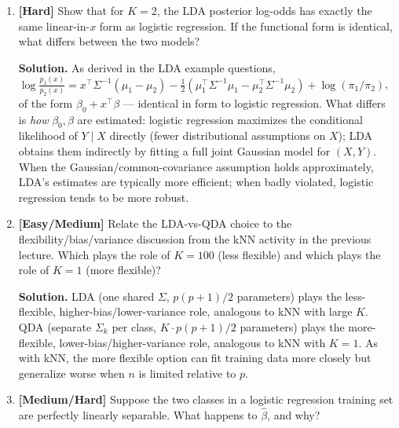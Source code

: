 \documentclass[11pt]{article}
\begin{document}
\begin{enumerate}
\textbf{Solution.} $\text{score}(D)=0.01\times0.9\times0.8=0.0072$; $\text{score}(\bar D)=0.99\times0.05\times0.1=0.00495$. Normalizing, $\Pr(D\mid x)\approx0.0072/0.01215\approx0.593$: classify as disease, though barely above $0.5$ despite a very low base rate --- strong evidence from two symptoms can overcome a low prior. Worth flagging: in a real diagnostic setting symptoms are often correlated, so this Naive Bayes estimate should be treated cautiously.

\item \textbf{[Hard]} Show that for $K=2$, the LDA posterior log-odds has exactly the same linear-in-$x$ form as logistic regression. If the functional form is identical, what differs between the two models?

\textbf{Solution.} As derived in the LDA example questions, $\log\frac{p_1(x)}{p_2(x)} = x^\top\Sigma^{-1}(\mu_1-\mu_2) - \tfrac12(\mu_1^\top\Sigma^{-1}\mu_1-\mu_2^\top\Sigma^{-1}\mu_2) + \log(\pi_1/\pi_2)$, of the form $\beta_0+x^\top\beta$ --- identical in form to logistic regression. What differs is \emph{how} $\beta_0,\beta$ are estimated: logistic regression maximizes the conditional likelihood of $Y\mid X$ directly (fewer distributional assumptions on $X$); LDA obtains them indirectly by fitting a full joint Gaussian model for $(X,Y)$. When the Gaussian/common-covariance assumption holds approximately, LDA's estimates are typically more efficient; when badly violated, logistic regression tends to be more robust.

\item \textbf{[Easy/Medium]} Relate the LDA-vs-QDA choice to the flexibility/bias/variance discussion from the kNN activity in the previous lecture. Which plays the role of $K=100$ (less flexible) and which plays the role of $K=1$ (more flexible)?

\textbf{Solution.} LDA (one shared $\Sigma$, $p(p+1)/2$ parameters) plays the less-flexible, higher-bias/lower-variance role, analogous to kNN with large $K$. QDA (separate $\Sigma_k$ per class, $K\cdot p(p+1)/2$ parameters) plays the more-flexible, lower-bias/higher-variance role, analogous to kNN with $K=1$. As with kNN, the more flexible option can fit training data more closely but generalize worse when $n$ is limited relative to $p$.

\item \textbf{[Medium/Hard]} Suppose the two classes in a logistic regression training set are perfectly linearly separable. What happens to $\hat\beta$, and why?


\end{enumerate}
\end{document}

